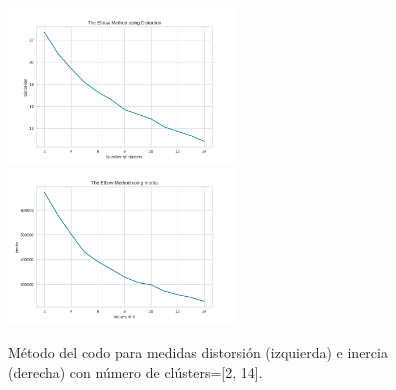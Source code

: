 \documentclass[10pt, a4paper]{article}
\begin{document}
		\begin{figure}[h!]
			\centering
			\includegraphics[width = 6cm]{ElbowM_Distortion_bf.png}
			\includegraphics[width = 6cm]{ElbowM_Inertia_bf.png}
			\caption{M\'etodo del codo para medidas distorsi\'on (izquierda) e inercia (derecha) con n\'umero de cl\'usters=[2, 14].}
		\end{figure}
	
\end{document}
